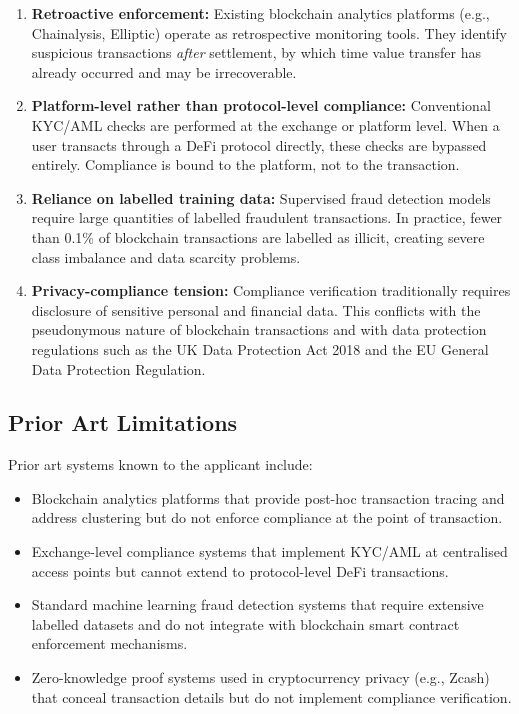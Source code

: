 \documentclass[12pt,a4paper]{article}
\begin{document}
\begin{enumerate}[label=(\alph*)]
\item \textbf{Retroactive enforcement:} Existing blockchain analytics 
platforms (e.g., Chainalysis, Elliptic) operate as retrospective monitoring 
tools. They identify suspicious transactions \emph{after} settlement, by 
which time value transfer has already occurred and may be irrecoverable.

\item \textbf{Platform-level rather than protocol-level compliance:} 
Conventional KYC/AML checks are performed at the exchange or platform level. 
When a user transacts through a DeFi protocol directly, these checks are 
bypassed entirely. Compliance is bound to the platform, not to the 
transaction.

\item \textbf{Reliance on labelled training data:} Supervised fraud detection 
models require large quantities of labelled fraudulent transactions. In 
practice, fewer than 0.1\% of blockchain transactions are labelled as 
illicit, creating severe class imbalance and data scarcity problems.

\item \textbf{Privacy-compliance tension:} Compliance verification 
traditionally requires disclosure of sensitive personal and financial data. 
This conflicts with the pseudonymous nature of blockchain transactions and 
with data protection regulations such as the UK Data Protection Act 2018 and 
the EU General Data Protection Regulation.
\end{enumerate}

\subsection{Prior Art Limitations}

Prior art systems known to the applicant include:

\begin{itemize}
\item Blockchain analytics platforms that provide post-hoc transaction 
tracing and address clustering but do not enforce compliance at the point of 
transaction.

\item Exchange-level compliance systems that implement KYC/AML at 
centralised access points but cannot extend to protocol-level DeFi 
transactions.

\item Standard machine learning fraud detection systems that require 
extensive labelled datasets and do not integrate with blockchain smart 
contract enforcement mechanisms.

\item Zero-knowledge proof systems used in cryptocurrency privacy (e.g., 
Zcash) that conceal transaction details but do not implement compliance 
verification.
\end{itemize}
\end{document}
